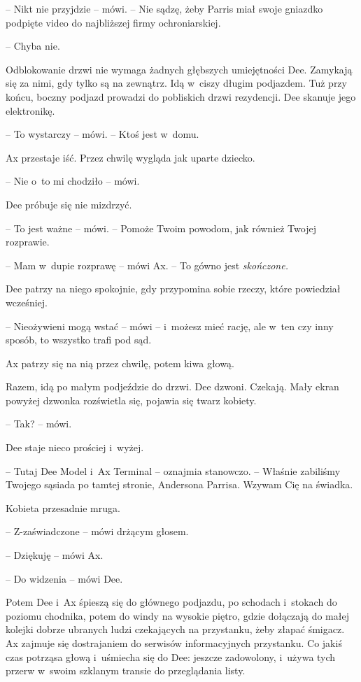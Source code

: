 \documentclass[oneside,polish,11pt,sfheadings]{mwbk}
\begin{document}
-- Nikt nie przyjdzie -- mówi. -- Nie sądzę, żeby Parris miał swoje
gniazdko podpięte video do najbliższej firmy ochroniarskiej.

-- Chyba nie.

Odblokowanie drzwi nie wymaga żadnych głębszych umiejętności Dee.
Zamykają się za nimi, gdy tylko są na zewnątrz. Idą w~ciszy długim
podjazdem. Tuż przy końcu, boczny podjazd prowadzi do pobliskich drzwi
rezydencji. Dee skanuje jego elektronikę.

-- To wystarczy -- mówi. -- Ktoś jest w~domu.

Ax przestaje iść. Przez chwilę wygląda jak uparte dziecko.

-- Nie o~to mi chodziło -- mówi.

Dee próbuje się nie mizdrzyć.

-- To jest ważne -- mówi. -- Pomoże Twoim powodom, jak również Twojej
rozprawie.

-- Mam w~dupie rozprawę -- mówi Ax. -- To gówno jest \emph{skończone.}

Dee patrzy na niego spokojnie, gdy przypomina sobie rzeczy, które
powiedział wcześniej.

-- Nieożywieni mogą wstać -- mówi -- i~możesz mieć rację, ale w~ten czy
inny sposób, to wszystko trafi pod sąd.

Ax patrzy się na nią przez chwilę, potem kiwa głową.

Razem, idą po małym podjeździe do drzwi. Dee dzwoni. Czekają. Mały ekran
powyżej dzwonka rozświetla się, pojawia się twarz kobiety.

-- Tak? -- mówi.

Dee staje nieco prościej i~wyżej.

-- Tutaj Dee Model i~Ax Terminal -- oznajmia stanowczo. -- Właśnie
zabiliśmy Twojego sąsiada po tamtej stronie, Andersona Parrisa. Wzywam
Cię na świadka.

Kobieta przesadnie mruga.

-- Z-zaświadczone -- mówi drżącym głosem.

-- Dziękuję -- mówi Ax.

-- Do widzenia -- mówi Dee.

Potem Dee i~Ax śpieszą się do głównego podjazdu, po schodach i~stokach
do poziomu chodnika, potem do windy na wysokie piętro, gdzie dołączają
do małej kolejki dobrze ubranych ludzi czekających na przystanku, żeby
złapać śmigacz. Ax zajmuje się dostrajaniem do serwisów informacyjnych
przystanku. Co jakiś czas potrząsa głową i~uśmiecha się do Dee: jeszcze
zadowolony, i~używa tych przerw w~swoim szklanym transie do przeglądania
listy.
\end{document}
